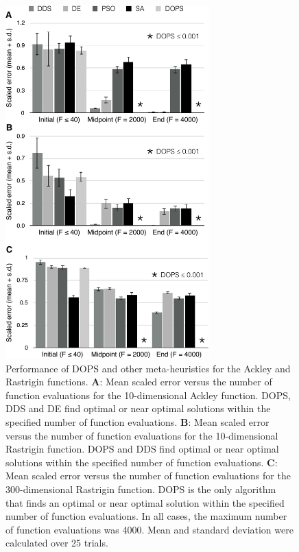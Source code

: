 \documentclass[12pt]{article}
\begin{document}
\begin{figure}[ht]
\centering
\includegraphics[width=0.7\textwidth]{./figs/Figure_2_TestFunctions-crop.pdf}
\caption{Performance of DOPS and other meta-heuristics for the Ackley and Rastrigin functions.
\textbf{A}: Mean scaled error versus the number of function evaluations for the 10-dimensional Ackley function. DOPS, DDS and DE find optimal or near optimal solutions within the specified number of function evaluations.
\textbf{B}: Mean scaled error versus the number of function evaluations for the 10-dimensional Rastrigin function. DOPS and DDS find optimal or near optimal solutions within the specified number of function evaluations.
\textbf{C}: Mean scaled error versus the number of function evaluations for the 300-dimensional Rastrigin function. DOPS is the only algorithm that finds an optimal or near optimal solution within the specified number of function evaluations. In all cases, the maximum number of function evaluations was 4000. Mean and standard deviation were calculated over 25 trials. }\label{fig-testfunctions}
\end{figure}
\end{document}
